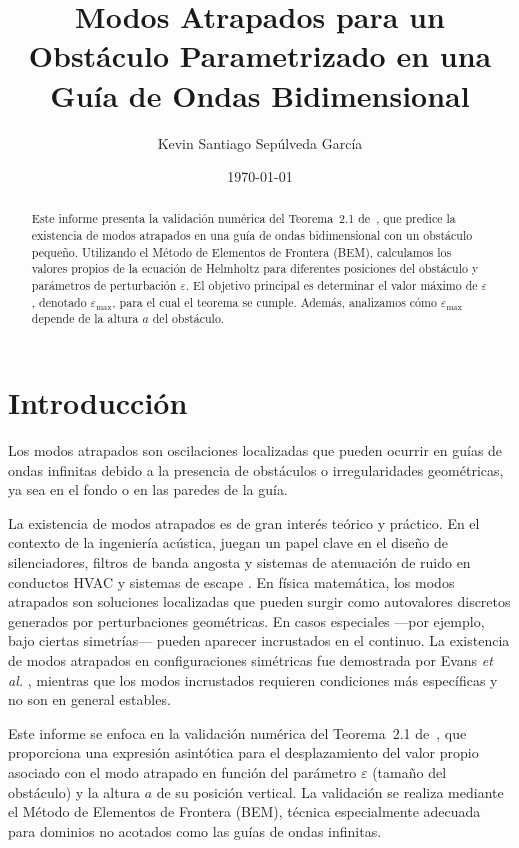 \documentclass[11pt]{article}
\title{Modos Atrapados para un Obstáculo Parametrizado en una Guía de Ondas Bidimensional}
\author{Kevin Santiago Sepúlveda García}
\date{\today}
\begin{document}
\maketitle

\begin{abstract}
Este informe presenta la validación numérica del Teorema~2.1 de~\cite{Zhevandrov2025}, que predice la existencia de modos atrapados en una guía de ondas bidimensional con un obstáculo pequeño. Utilizando el Método de Elementos de Frontera (BEM), calculamos los valores propios de la ecuación de Helmholtz para diferentes posiciones del obstáculo y parámetros de perturbación $\varepsilon$. El objetivo principal es determinar el valor máximo de $\varepsilon$, denotado $\varepsilon_{\max}$, para el cual el teorema se cumple. Además, analizamos cómo $\varepsilon_{\max}$ depende de la altura $a$ del obstáculo.
\end{abstract}

\section{Introducción}\label{sec:introduccion}

Los modos atrapados son oscilaciones localizadas que pueden ocurrir en guías de ondas infinitas debido a la presencia de obstáculos o irregularidades geométricas, ya sea en el fondo o en las paredes de la guía.

La existencia de modos atrapados es de gran interés teórico y práctico. En el contexto de la ingeniería acústica, juegan un papel clave en el diseño de silenciadores, filtros de banda angosta y sistemas de atenuación de ruido en conductos HVAC y sistemas de escape \cite{Kirby2005, Alkuhayli2025, Rämmal2009}. En física matemática, los modos atrapados son soluciones localizadas que pueden surgir como autovalores discretos generados por perturbaciones geométricas. En casos especiales —por ejemplo, bajo ciertas simetrías— pueden aparecer incrustados en el continuo. La existencia de modos atrapados en configuraciones simétricas fue demostrada por Evans \emph{et al.} \cite{Evans1994}, mientras que los modos incrustados requieren condiciones más específicas y no son en general estables.

Este informe se enfoca en la validación numérica del Teorema~2.1 de~\cite{Zhevandrov2025}, que proporciona una expresión asintótica para el desplazamiento del valor propio asociado con el modo atrapado en función del parámetro $\varepsilon$ (tamaño del obstáculo) y la altura $a$ de su posición vertical. La validación se realiza mediante el Método de Elementos de Frontera (BEM), técnica especialmente adecuada para dominios no acotados como las guías de ondas infinitas.
\end{document}
